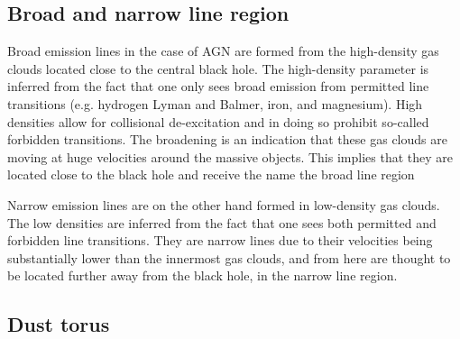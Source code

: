 



\subsection{Broad and narrow line region}

Broad emission lines in the case of AGN are formed from the high-density gas clouds located close to the central black hole. The 
high-density parameter is inferred from the fact that one only sees broad emission from permitted line transitions (e.g. hydrogen Lyman and Balmer,
iron, and magnesium). High densities allow for collisional de-excitation and in doing so prohibit so-called forbidden transitions.
The broadening is an indication that these gas clouds are moving at huge velocities around the massive objects. This implies that they are located close to the black hole and receive the name the broad line region

Narrow emission lines are on the other hand formed in low-density gas clouds. The low densities are inferred from the fact that one sees
both permitted and forbidden line transitions. They are narrow lines due to their velocities being substantially lower than the innermost gas clouds, and from here are thought to be located further away from the black hole, in the narrow line region. 


\subsection{Dust torus}

